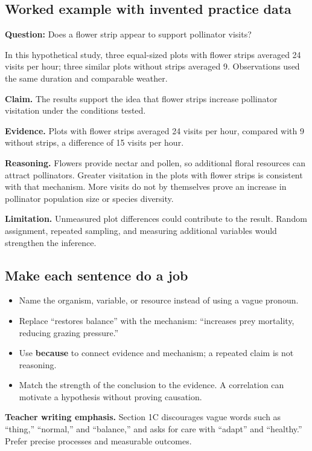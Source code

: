 \documentclass[11pt,letterpaper]{article}
\begin{document}
\subsection*{Worked example with invented practice data}
\textbf{Question:} Does a flower strip appear to support pollinator visits?

In this hypothetical study, three equal-sized plots with flower strips averaged 24 visits per hour; three similar plots without strips averaged 9. Observations used the same duration and comparable weather.

\textbf{Claim.} The results support the idea that flower strips increase pollinator visitation under the conditions tested.

\textbf{Evidence.} Plots with flower strips averaged 24 visits per hour, compared with 9 without strips, a difference of 15 visits per hour.

\textbf{Reasoning.} Flowers provide nectar and pollen, so additional floral resources can attract pollinators. Greater visitation in the plots with flower strips is consistent with that mechanism. More visits do not by themselves prove an increase in pollinator population size or species diversity.

\textbf{Limitation.} Unmeasured plot differences could contribute to the result. Random assignment, repeated sampling, and measuring additional variables would strengthen the inference.
\subsection*{Make each sentence do a job}
\begin{itemize}
\item Name the organism, variable, or resource instead of using a vague pronoun.
\item Replace ``restores balance'' with the mechanism: ``increases prey mortality, reducing grazing pressure.''
\item Use \textbf{because} to connect evidence and mechanism; a repeated claim is not reasoning.
\item Match the strength of the conclusion to the evidence. A correlation can motivate a hypothesis without proving causation.
\end{itemize}
\textbf{Teacher writing emphasis.} Section 1C discourages vague words such as ``thing,'' ``normal,'' and ``balance,'' and asks for care with ``adapt'' and ``healthy.'' Prefer precise processes and measurable outcomes.
\end{document}
